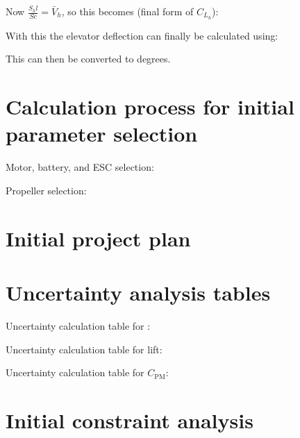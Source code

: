 \documentclass[../main.tex]{subfiles}
\begin{document}
Now $\frac{S_h  l}{S c}=\bar{V}_h$, so this becomes (final form of $C_{L_h}$):

	
With this the elevator deflection can finally be calculated using:

	
This can then be converted to degrees.

\section{Calculation process for initial parameter selection} \label{appendix:calculation-process-for-initial-parameter-selection}

Motor, battery, and ESC selection:


Propeller selection:


\section{Initial project plan} \label{appendix:initial-project-plan}


\section{Uncertainty analysis tables} \label{appendix:uncertainty-analysis-tables}

Uncertainty calculation table for \cd:


Uncertainty calculation table for lift:


Uncertainty calculation table for $C_\mathrm{PM}$:


\section{Initial constraint analysis} \label{appendix:initial-constraint-analysis}
\end{document}
